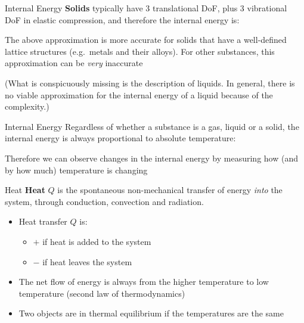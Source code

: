 \documentclass[12pt,aspectratio=169,dvipsnames]{beamer}
\begin{document}
\begin{frame}{Internal Energy}
  \textbf{Solids} typically have 3 translational DoF, plus 3 vibrational DoF in
  elastic compression, and therefore the internal energy is:


  \vspace{-.1in}The above approximation is more accurate for solids that have a
  well-defined lattice structures (e.g.\ metals and their alloys). For
  other substances, this approximation can be \emph{very} inaccurate

  \vspace{.2in}(What is conspicuously missing is the description of liquids.
  In general, there is no viable approximation for the internal energy of a
  liquid because of the complexity.)
\end{frame}


\begin{frame}{Internal Energy}
  Regardless of whether a substance is a gas, liquid or a solid, the internal
  energy is always proportional to absolute temperature:


  \vspace{-.1in}Therefore we can observe changes in the internal energy by
  measuring how (and by how much) temperature is changing
\end{frame}



\begin{frame}{Heat}
  \textbf{Heat} {\color{blue}$Q$} is the spontaneous non-mechanical transfer of
  energy \emph{into} the system, through conduction, convection and radiation.

  \begin{itemize}
  \item Heat transfer $Q$ is:
    \begin{itemize}
    \item $+$ if heat is added to the system
    \item $-$ if heat leaves the system
    \end{itemize}
  \item The net flow of energy is always from the higher temperature to low
    temperature (second law of thermodynamics)
  \item Two objects are in thermal equilibrium if the temperatures are the same
  \end{itemize}
\end{frame}
\end{document}

